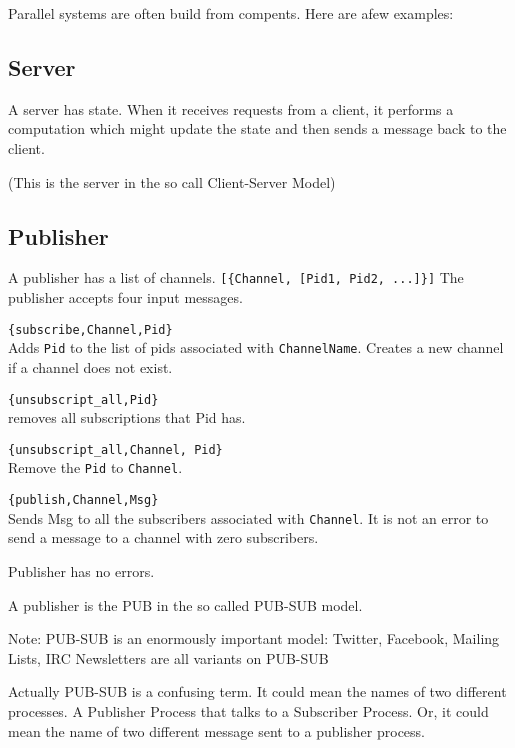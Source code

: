 \documentclass[10pt]{article}
\begin{document}
Parallel systems are often build from compents. Here are afew examples:

\subsection{Server}

A server has state. When it receives requests from a client, it
performs a computation which might update the state and then sends
a message back to the client.

(This is the server in the so call Client-Server Model)

\subsection{Publisher}

A publisher has a list of channels. \verb+[{Channel, [Pid1, Pid2, ...]}]+
The publisher accepts four input messages.

\begin{description}

\item \verb+{subscribe,Channel,Pid}+\\
  Adds \verb+Pid+ to the list
  of pids associated with \verb+ChannelName+. Creates a new channel if
  a channel does not exist.

\item \verb+{unsubscript_all,Pid}+\\
removes all subscriptions that Pid has.

\item \verb+{unsubscript_all,Channel, Pid}+\\
Remove the \verb+Pid+ to \verb+Channel+.
  
\item \verb+{publish,Channel,Msg}+\\ 
Sends Msg to all the subscribers associated with
\verb+Channel+. It is not an error to send a message to a channel with
zero subscribers.

\end{description}

Publisher has no errors.

A publisher is the PUB in the so called PUB-SUB model.

Note: PUB-SUB is an enormously important model: Twitter, Facebook,
Mailing Lists, IRC Newsletters are all variants on PUB-SUB

Actually PUB-SUB is a confusing term. It could mean the names of two
different processes. A Publisher Process that talks to a Subscriber
Process. Or, it could mean the name of two different message sent to a
publisher process.
\end{document}
